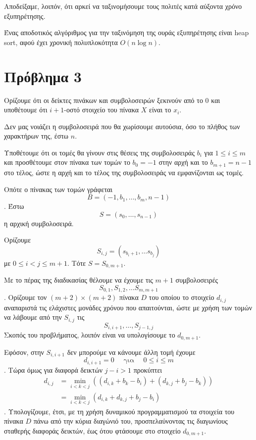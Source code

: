 \documentclass[12pt]{article}
\begin{document}
Αποδείξαμε, λοιπόν, ότι αρκεί να ταξινομήσουμε τους πολιτές κατά αύξοντα χρόνο εξυπηρέτησης. 

Ένας αποδοτικός αλγόριθμος για την ταξινόμηση της ουράς εξυπηρέτησης είναι heap sort, αφού έχει χρονική πολυπλοκότητα $O(n\log n)$. \hfill \blacksquare

\newpage
\section*{Πρόβλημα 3} 
Ορίζουμε ότι οι δείκτες πινάκων και συμβολοσειρών ξεκινούν από το \(0\) και υποθέτουμε ότι \(i+1\)-οστό στοιχείο του πίνακα \(X\) είναι το \(x_i\).
\bigskip

Δεν μας νοιάζει η συμβολοσειρά που θα χωρίσουμε αυτούσια, όσο το πλήθος των χαρακτήρων της, έστω \(n\). 

Υποθέτουμε ότι οι τομές θα γίνουν στις θέσεις της συμβολοσειράς \(b_i\) για \(1 \leq i \leq m\) και προσθέτουμε στον πίνακα των τομών το \(b_0 = -1\) στην αρχή και το \(b_{m+1} = n-1\) στο τέλος, ώστε η αρχή και το τέλος της συμβολοσειράς να εμφανίζονται ως τομές. 

Οπότε ο πίνακας των τομών γράφεται 
\[
    B = (-1, b_1, \ldots, b_m, n-1)
\].
Έστω \[S = (s_0, \ldots, s_{n-1})\] η αρχική συμβολοσειρά. 

Ορίζουμε 
\[
    S_{i,j} = (s_{b_i+1},\ldots s_{b_j})
\] με \(0 \leq i < j \leq m+1\).
Tότε \(S = S_{0, m+1}\).

Με το πέρας της διαδικασίας θέλουμε να έχουμε τις \(m+1\) συμβολοσειρές 
\[
    S_{0,1}, S_{1,2}, \ldots S_{m, m+1}
\].
Ορίζουμε τον \((m+2) \times (m+2)\) πίνακα \(D\) του οποίου το στοιχείο \(d_{i,j}\) αναπαριστά τις ελάχιστες μονάδες χρόνου που απαιτούνται, ώστε με χρήση των τομών να λάβουμε από την \(S_{i, j}\) τις 
\[
    S_{i,i+1},\ldots, S_{j-1, j}\]
Σκοπός του προβλήματος, λοιπόν είναι να υπολογίσουμε το \(d_{0, m+1}\). 

Εφόσον, στην \(S_{i,i+1}\) δεν μπορούμε να κάνουμε άλλη τομή έχουμε 
\[
    d_{i,i+1} = 0 \quad \text{  για  }\quad 0 \leq i \leq m\].
Τώρα όμως για διαφορά δεικτών \(j - i > 1\) προκύπτει
\begin{align*}
    d_{i,j} &= \min_{i < k < j} \left( (d_{i,k} + b_k - b_i) + (d_{k,j} + b_j - b_k) \right) \\
            &= \min_{i < k < j} \left( d_{i,k}+ d_{k,j} + b_j - b_i \right)
\end{align*}
. Υπολογίζουμε, έτσι, με τη χρήση δυναμικού προγραμματισμού τα στοιχεία του πίνακα \(D\) πάνω από την κύρια διαγώνιό του, προσπελαύνοντας τις διαγωνίους σταθερής διαφοράς δεικτών, έως ότου φτάσουμε στο στοιχείο \(d_{0, m+1}\). 
\end{document}
